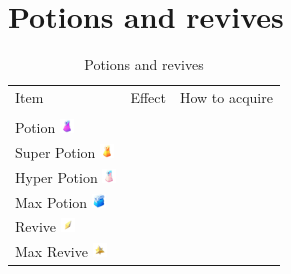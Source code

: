 \section{Potions and revives}

\begin{table}[ht]
\begin{center}
\begin{tabular}{lll}
Item & Effect & How to acquire \\
\Midrule\\
Potion \includegraphics[width=1em]{images/Potion.png} & & \\
Super Potion \includegraphics[width=1em]{images/superpotion.png} & & \\
Hyper Potion \includegraphics[width=1em]{images/Hyper_Potion.png} & & \\
Max Potion \includegraphics[width=1em]{images/Max_Potion.png} & &\\
Revive \includegraphics[width=1em]{images/revive.png} & & \\
Max Revive \includegraphics[width=1em]{images/maxrevive.png} & & \\
\end{tabular}
\end{center}
\caption{Potions and revives}
\label{table:potions}
\end{table}

